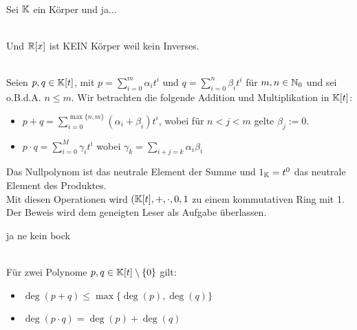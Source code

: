 \begin{example}\,
\\Sei $\mathbb{K}$ ein Körper und ja...
\end{example}

\begin{example}\, %
\\Und $\mathbb{R}[x]$ ist KEIN Körper weil kein Inverses.
\end{example}

\begin{proposition}\,\\
Seien $p,q\in\mathbb{K}[t]$, mit $p=\sum_{i=0}^m\alpha_it^i$ und $q=\sum_{i=0}^n\beta_it^i$ für $m,n\in\mathbb{N}_0$ und sei o.B.d.A. $n \leq m$.
Wir betrachten die folgende Addition und Multiplikation in $\mathbb{K}[t]$:
\begin{itemize}
    \item $p+q=\sum_{i=0}^{\max{\{n,m\}}}(\alpha_i+\beta_i)t^i$, wobei für $n<j<m$ gelte $\beta_j:=0$.
    \item $p \cdot q = \sum_{i=0}^M\gamma_it^i$ wobei $\gamma_k=\sum_{i+j=k}\alpha_i\beta_i$
\end{itemize}
Das Nullpolynom ist das neutrale Element der Summe und $1_{\mathbb{K}}=t^0$ das neutrale Element des Produktes.\\
Mit diesen Operationen wird $(\mathbb{K}[t],+,\cdot,0,1$ zu einem kommutativen Ring mit 1. 
Der Beweis wird dem geneigten Leser als Aufgabe überlassen.
\end{proposition}

\begin{example}
ja ne kein bock
\end{example}

\begin{lemma}\,\\
Für zwei Polynome $p,q\in\mathbb{K}[t]\setminus\{0\}$ gilt:
\begin{itemize}
    \item $\deg(p + q) \leq \max\{\deg(p),\deg(q)\}$
    \item $\deg(p \cdot q)=\deg(p)+\deg(q)$
\end{itemize}
\end{lemma}

